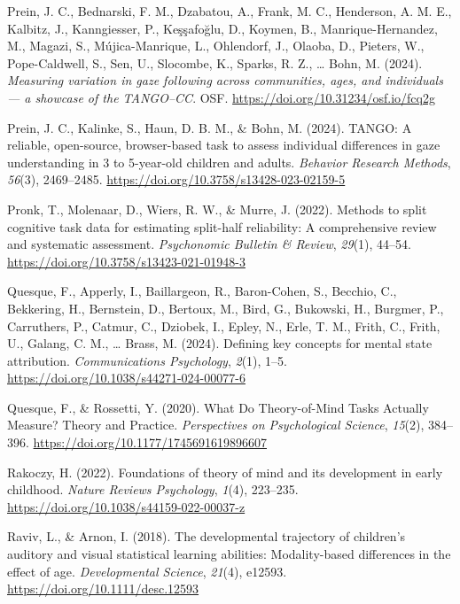 \documentclass[
]{scrbook}
\newlength{\cslhangindent}
\newenvironment{CSLReferences}[2] %
 {\begin{list}{}{%
  \setlength{\itemindent}{0pt}
  \setlength{\leftmargin}{0pt}
  \setlength{\parsep}{0pt}
  \ifodd #1
   \setlength{\leftmargin}{\cslhangindent}
   \setlength{\itemindent}{-1\cslhangindent}
  \fi
  \setlength{\itemsep}{#2\baselineskip}}}
 {\end{list}}
\begin{document}
\begin{CSLReferences}{1}{0}
Prein, J. C., Bednarski, F. M., Dzabatou, A., Frank, M. C., Henderson, A. M. E., Kalbitz, J., Kanngiesser, P., Keşşafoğlu, D., Koymen, B., Manrique-Hernandez, M., Magazi, S., Mújica-Manrique, L., Ohlendorf, J., Olaoba, D., Pieters, W., Pope-Caldwell, S., Sen, U., Slocombe, K., Sparks, R. Z., \ldots{} Bohn, M. (2024). \emph{Measuring variation in gaze following across communities, ages, and individuals --- a showcase of the {TANGO}--{CC}}. OSF. \url{https://doi.org/10.31234/osf.io/fcq2g}

Prein, J. C., Kalinke, S., Haun, D. B. M., \& Bohn, M. (2024). {TANGO}: {A} reliable, open-source, browser-based task to assess individual differences in gaze understanding in 3 to 5-year-old children and adults. \emph{Behavior Research Methods}, \emph{56}(3), 2469--2485. \url{https://doi.org/10.3758/s13428-023-02159-5}

Pronk, T., Molenaar, D., Wiers, R. W., \& Murre, J. (2022). Methods to split cognitive task data for estimating split-half reliability: {A} comprehensive review and systematic assessment. \emph{Psychonomic Bulletin \& Review}, \emph{29}(1), 44--54. \url{https://doi.org/10.3758/s13423-021-01948-3}

Quesque, F., Apperly, I., Baillargeon, R., Baron-Cohen, S., Becchio, C., Bekkering, H., Bernstein, D., Bertoux, M., Bird, G., Bukowski, H., Burgmer, P., Carruthers, P., Catmur, C., Dziobek, I., Epley, N., Erle, T. M., Frith, C., Frith, U., Galang, C. M., \ldots{} Brass, M. (2024). Defining key concepts for mental state attribution. \emph{Communications Psychology}, \emph{2}(1), 1--5. \url{https://doi.org/10.1038/s44271-024-00077-6}

Quesque, F., \& Rossetti, Y. (2020). What {Do Theory-of-Mind Tasks Actually Measure}? {Theory} and {Practice}. \emph{Perspectives on Psychological Science}, \emph{15}(2), 384--396. \url{https://doi.org/10.1177/1745691619896607}

Rakoczy, H. (2022). Foundations of theory of mind and its development in early childhood. \emph{Nature Reviews Psychology}, \emph{1}(4), 223--235. \url{https://doi.org/10.1038/s44159-022-00037-z}

Raviv, L., \& Arnon, I. (2018). The developmental trajectory of children's auditory and visual statistical learning abilities: Modality-based differences in the effect of age. \emph{Developmental Science}, \emph{21}(4), e12593. \url{https://doi.org/10.1111/desc.12593}


\end{CSLReferences}
\end{document}
